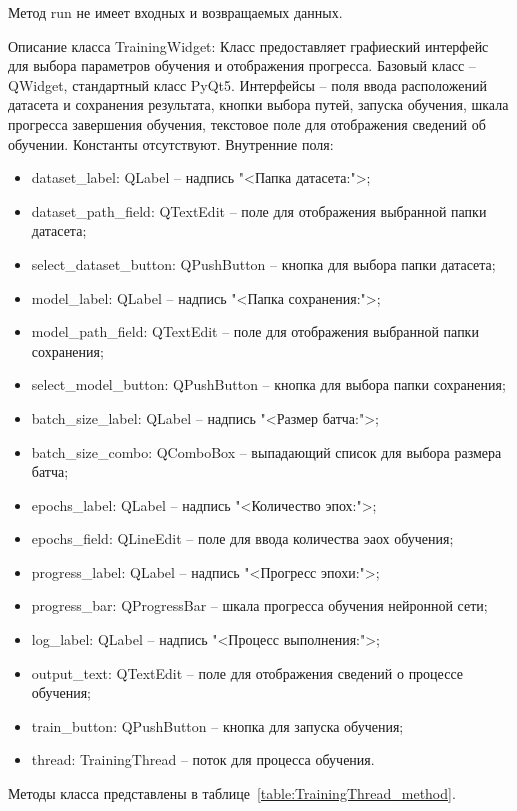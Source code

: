 Метод run не имеет входных и возвращаемых данных.

Описание класса TrainingWidget:
Класс предоставляет графиеский интерфейс для выбора параметров обучения и отображения прогресса. Базовый класс -- QWidget, стандартный класс PyQt5. Интерфейсы -- поля ввода расположений датасета и сохранения результата, кнопки выбора путей, запуска обучения, шкала прогресса завершения обучения, текстовое поле для отображения сведений об обучении. Константы отсутствуют. Внутренние поля:
\begin{itemize}
	\item dataset\_label: QLabel -- надпись "<Папка датасета:">;
	\item dataset\_path\_field: QTextEdit -- поле для отображения выбранной папки датасета;
	\item select\_dataset\_button: QPushButton -- кнопка для выбора папки датасета;
	\item model\_label: QLabel -- надпись "<Папка сохранения:">;
	\item model\_path\_field: QTextEdit -- поле для отображения выбранной папки сохранения;
	\item select\_model\_button: QPushButton -- кнопка для выбора папки сохранения;
	\item batch\_size\_label: QLabel -- надпись "<Размер батча:">;
	\item batch\_size\_combo: QComboBox -- выпадающий список для выбора размера батча;
	\item epochs\_label: QLabel -- надпись "<Количество эпох:">;
	\item epochs\_field: QLineEdit -- поле для ввода количества эаох обучения;
	\item progress\_label: QLabel -- надпись "<Прогресс эпохи:">;
	\item progress\_bar: QProgressBar -- шкала прогресса обучения нейронной сети;
	\item log\_label: QLabel -- надпись "<Процесс выполнения:">;
	\item output\_text: QTextEdit -- поле для отображения сведений о процессе обучения;
	\item train\_button: QPushButton -- кнопка для запуска обучения;
	\item thread: TrainingThread -- поток для процесса обучения.
\end{itemize}
Методы класса представлены в таблице~\ref{table:TrainingThread_method}.
\renewcommand{\arraystretch}{0.8} %

